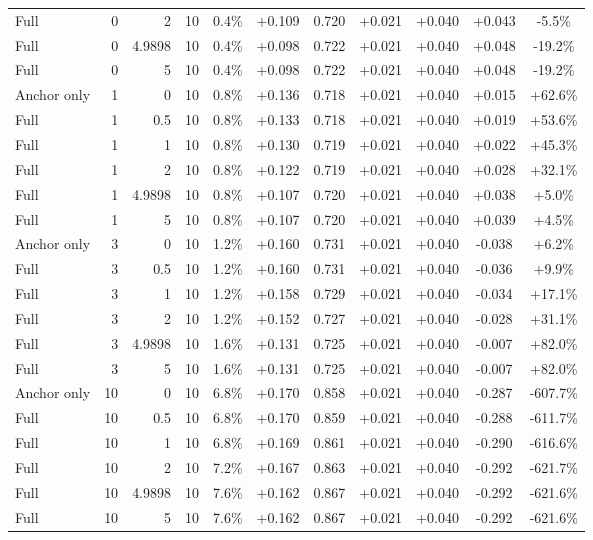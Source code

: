 \begin{table}[htbp]
\begin{tabular}{lrrrccccccc}
Full & 0 & 2 & 10 & 0.4\% & +0.109 & 0.720 & +0.021 & +0.040 & +0.043 & -5.5\% \\
Full & 0 & 4.9898 & 10 & 0.4\% & +0.098 & 0.722 & +0.021 & +0.040 & +0.048 & -19.2\% \\
Full & 0 & 5 & 10 & 0.4\% & +0.098 & 0.722 & +0.021 & +0.040 & +0.048 & -19.2\% \\
Anchor only & 1 & 0 & 10 & 0.8\% & +0.136 & 0.718 & +0.021 & +0.040 & +0.015 & +62.6\% \\
Full & 1 & 0.5 & 10 & 0.8\% & +0.133 & 0.718 & +0.021 & +0.040 & +0.019 & +53.6\% \\
Full & 1 & 1 & 10 & 0.8\% & +0.130 & 0.719 & +0.021 & +0.040 & +0.022 & +45.3\% \\
Full & 1 & 2 & 10 & 0.8\% & +0.122 & 0.719 & +0.021 & +0.040 & +0.028 & +32.1\% \\
Full & 1 & 4.9898 & 10 & 0.8\% & +0.107 & 0.720 & +0.021 & +0.040 & +0.038 & +5.0\% \\
Full & 1 & 5 & 10 & 0.8\% & +0.107 & 0.720 & +0.021 & +0.040 & +0.039 & +4.5\% \\
Anchor only & 3 & 0 & 10 & 1.2\% & +0.160 & 0.731 & +0.021 & +0.040 & -0.038 & +6.2\% \\
Full & 3 & 0.5 & 10 & 1.2\% & +0.160 & 0.731 & +0.021 & +0.040 & -0.036 & +9.9\% \\
Full & 3 & 1 & 10 & 1.2\% & +0.158 & 0.729 & +0.021 & +0.040 & -0.034 & +17.1\% \\
Full & 3 & 2 & 10 & 1.2\% & +0.152 & 0.727 & +0.021 & +0.040 & -0.028 & +31.1\% \\
Full & 3 & 4.9898 & 10 & 1.6\% & +0.131 & 0.725 & +0.021 & +0.040 & -0.007 & +82.0\% \\
Full & 3 & 5 & 10 & 1.6\% & +0.131 & 0.725 & +0.021 & +0.040 & -0.007 & +82.0\% \\
Anchor only & 10 & 0 & 10 & 6.8\% & +0.170 & 0.858 & +0.021 & +0.040 & -0.287 & -607.7\% \\
Full & 10 & 0.5 & 10 & 6.8\% & +0.170 & 0.859 & +0.021 & +0.040 & -0.288 & -611.7\% \\
Full & 10 & 1 & 10 & 6.8\% & +0.169 & 0.861 & +0.021 & +0.040 & -0.290 & -616.6\% \\
Full & 10 & 2 & 10 & 7.2\% & +0.167 & 0.863 & +0.021 & +0.040 & -0.292 & -621.7\% \\
Full & 10 & 4.9898 & 10 & 7.6\% & +0.162 & 0.867 & +0.021 & +0.040 & -0.292 & -621.6\% \\
Full & 10 & 5 & 10 & 7.6\% & +0.162 & 0.867 & +0.021 & +0.040 & -0.292 & -621.6\% \\

\end{tabular}
\end{table}
